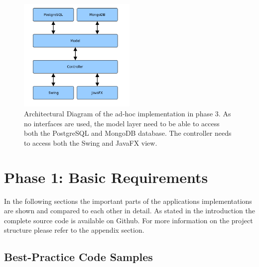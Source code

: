 \begin{figure}[htbp]
		\centering
	\includegraphics[width=0.5\textwidth]{./content/pictures/monoV3.jpg}
	\caption[Architectual Diagram of the ad-hoc implementation in phase 3.]{Architectural Diagram of the ad-hoc implementation in phase 3. As no interfaces are used, the model layer need to be able to access both the PostgreSQL and MongoDB database. The controller needs to access both the Swing and JavaFX view.}
	\label{fig:monoV3}
\end{figure}

\clearpage
\section{Phase 1: Basic Requirements}
\label{sec:code-samples}
In the following sections the important parts of the applications implementations are shown and compared to each other in detail. As stated in the introduction the complete source code is available on Github. For more information on the project structure please refer to the appendix section.

\subsection{Best-Practice Code Samples}

